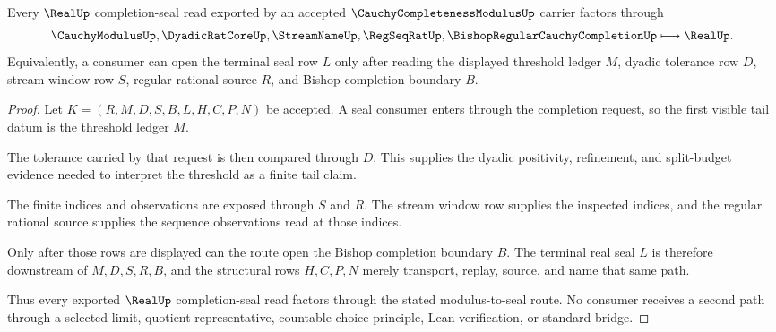 \begin{theorem}
\label{thm:cauchy-completeness-modulus-real-seal-route}
Every $\RealUp$ completion-seal read exported by an accepted $\CauchyCompletenessModulusUp$ carrier factors through
$$
\CauchyModulusUp,\DyadicRatCoreUp,\StreamNameUp,\RegSeqRatUp,\BishopRegularCauchyCompletionUp \longmapsto \RealUp .
$$
Equivalently, a consumer can open the terminal seal row $L$ only after reading the displayed threshold ledger $M$, dyadic tolerance row $D$, stream window row $S$, regular rational source $R$, and Bishop completion boundary $B$.
\end{theorem}
\begin{proof}
Let $K=(R,M,D,S,B,L,H,C,P,N)$ be accepted. A seal consumer enters through the completion request, so the first visible tail datum is the threshold ledger $M$.

The tolerance carried by that request is then compared through $D$. This supplies the dyadic positivity, refinement, and split-budget evidence needed to interpret the threshold as a finite tail claim.

The finite indices and observations are exposed through $S$ and $R$. The stream window row supplies the inspected indices, and the regular rational source supplies the sequence observations read at those indices.

Only after those rows are displayed can the route open the Bishop completion boundary $B$. The terminal real seal $L$ is therefore downstream of $M,D,S,R,B$, and the structural rows $H,C,P,N$ merely transport, replay, source, and name that same path.

Thus every exported $\RealUp$ completion-seal read factors through the stated modulus-to-seal route. No consumer receives a second path through a selected limit, quotient representative, countable choice principle, Lean verification, or standard bridge.
\end{proof}


